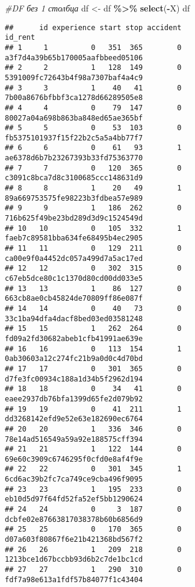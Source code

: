 \documentclass[
]{article}
\newenvironment{Shaded}{\begin{snugshade}}{\end{snugshade}}
\newcommand{\CommentTok}[1]{\textcolor[rgb]{0.56,0.35,0.01}{\textit{#1}}}
\newcommand{\FunctionTok}[1]{\textcolor[rgb]{0.13,0.29,0.53}{\textbf{#1}}}
\newcommand{\NormalTok}[1]{#1}
\newcommand{\OtherTok}[1]{\textcolor[rgb]{0.56,0.35,0.01}{#1}}
\newcommand{\SpecialCharTok}[1]{\textcolor[rgb]{0.81,0.36,0.00}{\textbf{#1}}}
\begin{document}
\begin{Shaded}
\begin{Highlighting}[]
\CommentTok{\#DF без 1 столбца}
\NormalTok{df }\OtherTok{\textless{}{-}}\NormalTok{ df }\SpecialCharTok{\%\textgreater{}\%} \FunctionTok{select}\NormalTok{(}\SpecialCharTok{{-}}\NormalTok{X)}
\NormalTok{df}
\end{Highlighting}
\end{Shaded}

\begin{verbatim}
##      id experience start stop accident                          id_rent
## 1     1          0   351  365        0 a3f7d4a39b65b170005aafbbeed05106
## 2     2          1   128  149        0 5391009fc72643b4f98a7307baf4a4c9
## 3     3          1    40   41        0 7b00a8676bfbbf3ca1278d66289505e8
## 4     4          0    79  147        0 80027a04a698b863ba848ed65ae365bf
## 5     5          0    53  103        0 fb5375101937f15f22b2c5a5a4bb77f7
## 6     6          0    61   93        1 ae6378d6b7b23267393b33fd75363770
## 7     7          0   120  365        0 c3091c8bca7d8c3100685ccc148631d9
## 8     8          1    20   49        1 89a669753575fe98223b3fdbea57e989
## 9     9          1   186  262        0 716b625f49be23bd289d3d9c1524549d
## 10   10          0   105  332        1 faeb7c89581bba634fe68495b4ec2905
## 11   11          0   129  211        0 ca00e9f0a4452dc057a499d7a5ac17ed
## 12   12          0   302  315        0 c67eb5dce80c1c1370d80cd00dd033e5
## 13   13          1    86  127        0 663cb8ae0cb45824de70809ff86e087f
## 14   14          0    40   73        0 33c1ba94dfa4dacf8bed03ed03581248
## 15   15          1   262  264        0 fd09a2fd30682abeb1cfb41991ae639e
## 16   16          0   113  154        1 0ab30603a12c274fc21b9a0d0c4d70bd
## 17   17          0   301  365        0 d7fe3fc00934c188a1d34b5f2962d194
## 18   18          0    34   41        0 eaee2937db76bfa1399d65fe2d079b92
## 19   19          0    41  211        1 dd3268142efd9e52e63e182690ec6764
## 20   20          1   336  346        0 78e14ad516549a59a92e188575cff394
## 21   21          1   122  144        0 69e60c3909c6746295f0cfd0e8af4f9e
## 22   22          0   301  345        1 6cd6ac39b2fc7ca749ce9cba496f9095
## 23   23          1   195  233        0 eb10d5d97f64fd52fa52ef5bb1290624
## 24   24          0     3  187        0 dcbfe02e87663817038378b60b6856d9
## 25   25          0   170  365        0 d07a603f80867f6e21b421368bd567f2
## 26   26          1   209  218        0 1213bce1d67bccbb93d6b2c7de1bc1cd
## 27   27          1   290  310        0 fdf7a98e613a1fdf57b84077f1c43404

\end{verbatim}
\end{document}

